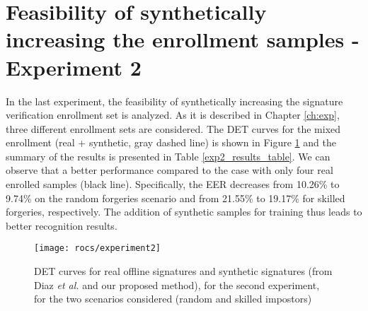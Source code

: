 \section{Feasibility of synthetically increasing the enrollment samples - Experiment 2}
In the last experiment, the feasibility of synthetically
increasing the signature verification enrollment set is analyzed. As it is described in
Chapter \ref{ch:exp}, three different enrollment sets are considered. The DET curves for the mixed enrollment (real + synthetic, gray dashed line) is shown in Figure \ref{fig:exp2} and the summary of the results is presented in Table \ref{exp2_results_table}. We can observe that a better performance compared to the case with only four real
enrolled samples (black line). Specifically, the EER decreases from 10.26\% to 9.74\% on the random forgeries scenario and from 21.55\% to 19.17\% for skilled forgeries, respectively. The addition of synthetic samples for training thus leads to better recognition results.
\begin{figure}[!htb]
    \centering
    

    \texttt{[image: rocs/experiment2]}
    \caption{DET curves for real offline signatures and synthetic signatures (from Diaz \textit{et al.} and our proposed method), for the second experiment, for the two scenarios considered (random and skilled impostors)}
    \label{fig:exp2}
\end{figure}

